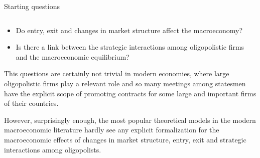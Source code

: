 \documentclass[9pt]{beamer}
\begin{document}
\begin{frame}{Starting questions}

\begin{columns}[T]
\begin{column}{.6\textwidth}
\begin{block}{}

\begin{itemize}

\item
Do entry, exit and changes in market structure affect the macroeconomy?

\item Is there a link between the strategic interactions among oligopolistic firms and the macroeconomic equilibrium?

\end{itemize}

\smallskip
\small
This questions are certainly not trivial in modern economies, where large oligopolistic firms play a relevant role and so many meetings among statesmen have the explicit scope of promoting contracts for some large and important firms of their countries. 

However, surprisingly enough, the most popular theoretical models in the modern macroeconomic literature hardly see any explicit formalization for the macroeconomic effects of changes in market structure, entry, exit and strategic interactions among oligopolists.
     
\end{block}
\end{column}


\end{columns}
\end{frame}
\end{document}
